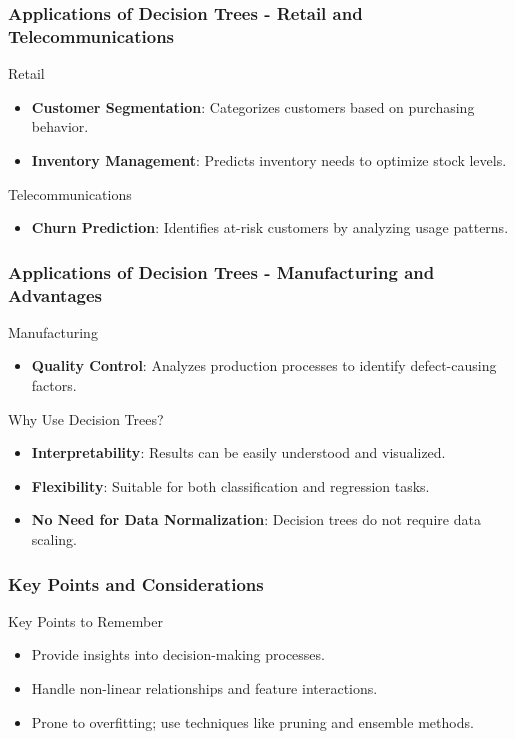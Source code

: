 \documentclass[aspectratio=169]{beamer}
\begin{document}
\begin{frame}[fragile]
  \frametitle{Applications of Decision Trees - Retail and Telecommunications}
  \begin{block}{Retail}
    \begin{itemize}
      \item \textbf{Customer Segmentation}: Categorizes customers based on purchasing behavior.
      \item \textbf{Inventory Management}: Predicts inventory needs to optimize stock levels.
    \end{itemize}
  \end{block}
  
  \begin{block}{Telecommunications}
    \begin{itemize}
      \item \textbf{Churn Prediction}: Identifies at-risk customers by analyzing usage patterns.
    \end{itemize}
  \end{block}
\end{frame}

\begin{frame}[fragile]
  \frametitle{Applications of Decision Trees - Manufacturing and Advantages}
  \begin{block}{Manufacturing}
    \begin{itemize}
      \item \textbf{Quality Control}: Analyzes production processes to identify defect-causing factors.
    \end{itemize}
  \end{block}
  
  \begin{block}{Why Use Decision Trees?}
    \begin{itemize}
      \item \textbf{Interpretability}: Results can be easily understood and visualized.
      \item \textbf{Flexibility}: Suitable for both classification and regression tasks.
      \item \textbf{No Need for Data Normalization}: Decision trees do not require data scaling.
    \end{itemize}
  \end{block}
\end{frame}

\begin{frame}[fragile]
  \frametitle{Key Points and Considerations}
  \begin{block}{Key Points to Remember}
    \begin{itemize}
      \item Provide insights into decision-making processes.
      \item Handle non-linear relationships and feature interactions.
      \item Prone to overfitting; use techniques like pruning and ensemble methods.
    \end{itemize}
  \end{block}
\end{frame}
\end{document}
